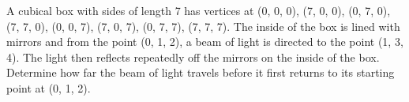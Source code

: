 A cubical box with sides of length 7 has vertices at (0, 0, 0), (7, 0, 0), (0,
7, 0), (7, 7, 0), (0, 0, 7), (7, 0, 7), (0, 7, 7), (7, 7, 7). The inside of
the box is lined with mirrors and from the point (0, 1, 2), a beam of light
is directed to the point (1, 3, 4). The light then reflects repeatedly off
the mirrors on the inside of the box. Determine how far the beam of light
travels before it first returns to its starting point at (0, 1, 2).
